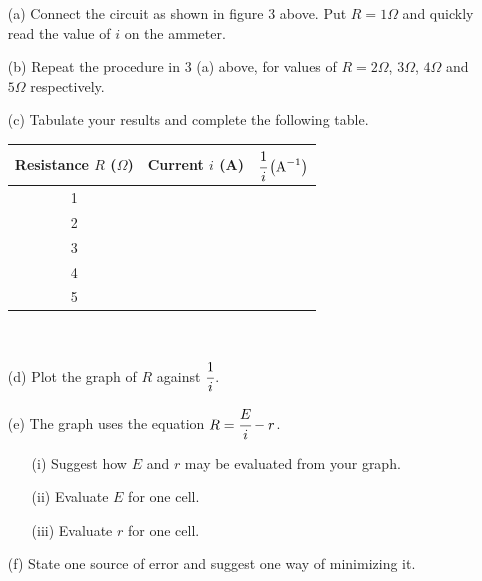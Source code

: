 \begin{enumerate}
\begin{enumerate}
\item[(a)] Connect the circuit as shown in figure 3 above. Put $R = 1 \Omega$ and quickly read the value of $i$ on the ammeter.
\item[(b)] Repeat the procedure in 3 (a) above, for values of $R = 2 \Omega$, $3 \Omega$, $4 \Omega$ and $5 \Omega$ respectively.
\item[(c)] Tabulate your results and complete the following table.
\begin{center}
\begin{tabular}{|c|c|c|} \hline
\textbf{Resistance $R$ ($\Omega$)} & \textbf{Current $i$ (A)} & \textbf{$\cfrac{1}{i} \left(\text{A}^{-1}\right)$ } \\ \hline
1&& \\
2&& \\
3&& \\
4&& \\
5&& \\ \hline
\end{tabular} \\[10pt]
\end{center}
\item[(d)] Plot the graph of $R$ against $\cfrac{1}{i}$.
\item[(e)] The graph uses the equation $R = \cfrac{E}{i} - r$.
\begin{enumerate}
\item[(i)] Suggest how $E$ and $r$ may be evaluated from your graph.
\item[(ii)] Evaluate $E$ for one cell.
\item[(iii)] Evaluate $r$ for one cell.
\end{enumerate}
\item[(f)] State one source of error and suggest one way of minimizing it.
\end{enumerate}

\end{enumerate}